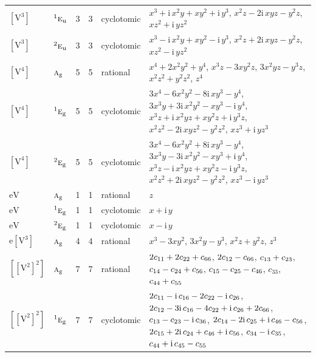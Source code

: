 \documentclass[10pt,a4paper]{article}
\numberwithin{equation}{section}
\newcommand{\irr}[1]{\text{\normalfont\scshape #1}}
\newcommand{\conjpair}[1]{{}^{#1}}
\newcommand{\ptag}[1]{\mathrm{#1}}
\newcommand{\iunit}{\mathrm{i}}
\newcommand{\jahn}[1]{\mathrm{#1}}
\newlength{\fillwidth}\newlength{\cellwidth}\newlength{\colwidth}
\newcommand{\signbreak}{\penalty100\relax}
\begin{document}
{\begin{longtable}{@{}llrrl>{\RaggedRight\arraybackslash}p{\fillwidth}@{}}
$\jahn{[V^{3}]}$ & $\conjpair{1}\irr{e}_{\ptag{u}}$ & 3 & 3 & cyclotomic & $x^{3} + \iunit{}\,x^{2}y + xy^{2} + \iunit{}\,y^{3}$, $x^{2}z - 2\iunit{}\,xyz - y^{2}z$, $xz^{2} + \iunit{}\,yz^{2}$\\
$\jahn{[V^{3}]}$ & $\conjpair{2}\irr{e}_{\ptag{u}}$ & 3 & 3 & cyclotomic & $x^{3} - \iunit{}\,x^{2}y + xy^{2} - \iunit{}\,y^{3}$, $x^{2}z + 2\iunit{}\,xyz - y^{2}z$, $xz^{2} - \iunit{}\,yz^{2}$\\
$\jahn{[V^{4}]}$ & $\irr{a}_{\ptag{g}}$ & 5 & 5 & rational & $x^{4} + 2x^{2}y^{2} + y^{4}$, $x^{3}z - 3xy^{2}z$, $3x^{2}yz - y^{3}z$, $x^{2}z^{2} + y^{2}z^{2}$, $z^{4}$\\
$\jahn{[V^{4}]}$ & $\conjpair{1}\irr{e}_{\ptag{g}}$ & 5 & 5 & cyclotomic & $3x^{4} - 6x^{2}y^{2} - 8\iunit{}\,xy^{3} - y^{4}$, $3x^{3}y + 3\iunit{}\,x^{2}y^{2} - xy^{3} - \iunit{}\,y^{4}$, $x^{3}z + \iunit{}\,x^{2}yz + xy^{2}z + \iunit{}\,y^{3}z$, $x^{2}z^{2} - 2\iunit{}\,xyz^{2} - y^{2}z^{2}$, $xz^{3} + \iunit{}\,yz^{3}$\\
$\jahn{[V^{4}]}$ & $\conjpair{2}\irr{e}_{\ptag{g}}$ & 5 & 5 & cyclotomic & $3x^{4} - 6x^{2}y^{2} + 8\iunit{}\,xy^{3} - y^{4}$, $3x^{3}y - 3\iunit{}\,x^{2}y^{2} - xy^{3} + \iunit{}\,y^{4}$, $x^{3}z - \iunit{}\,x^{2}yz + xy^{2}z - \iunit{}\,y^{3}z$, $x^{2}z^{2} + 2\iunit{}\,xyz^{2} - y^{2}z^{2}$, $xz^{3} - \iunit{}\,yz^{3}$\\
$\jahn{eV}$ & $\irr{a}_{\ptag{g}}$ & 1 & 1 & rational & $z$\\
$\jahn{eV}$ & $\conjpair{1}\irr{e}_{\ptag{g}}$ & 1 & 1 & cyclotomic & $x + \iunit{}\,y$\\
$\jahn{eV}$ & $\conjpair{2}\irr{e}_{\ptag{g}}$ & 1 & 1 & cyclotomic & $x - \iunit{}\,y$\\
$\jahn{e[V^{3}]}$ & $\irr{a}_{\ptag{g}}$ & 4 & 4 & rational & $x^{3} - 3xy^{2}$, $3x^{2}y - y^{3}$, $x^{2}z + y^{2}z$, $z^{3}$\\
$\jahn{[[V^{2}]^{2}]}$ & $\irr{a}_{\ptag{g}}$ & 7 & 7 & rational & $2c_{11} +\signbreak 2c_{22} +\signbreak c_{66}$, $2c_{12} -\signbreak c_{66}$, $c_{13} +\signbreak c_{23}$, $c_{14} -\signbreak c_{24} +\signbreak c_{56}$, $c_{15} -\signbreak c_{25} -\signbreak c_{46}$, $c_{33}$, $c_{44} +\signbreak c_{55}$\\
$\jahn{[[V^{2}]^{2}]}$ & $\conjpair{1}\irr{e}_{\ptag{g}}$ & 7 & 7 & cyclotomic & $2c_{11} -\signbreak \iunit{}\,c_{16} -\signbreak 2c_{22} -\signbreak \iunit{}\,c_{26}$, $2c_{12} -\signbreak 3\iunit{}\,c_{16} -\signbreak 4c_{22} +\signbreak \iunit{}\,c_{26} +\signbreak 2c_{66}$, $c_{13} -\signbreak c_{23} -\signbreak \iunit{}\,c_{36}$, $2c_{14} -\signbreak 2\iunit{}\,c_{25} +\signbreak \iunit{}\,c_{46} -\signbreak c_{56}$, $2c_{15} +\signbreak 2\iunit{}\,c_{24} +\signbreak c_{46} +\signbreak \iunit{}\,c_{56}$, $c_{34} -\signbreak \iunit{}\,c_{35}$, $c_{44} +\signbreak \iunit{}\,c_{45} -\signbreak c_{55}$\\

\end{longtable}}
\end{document}
